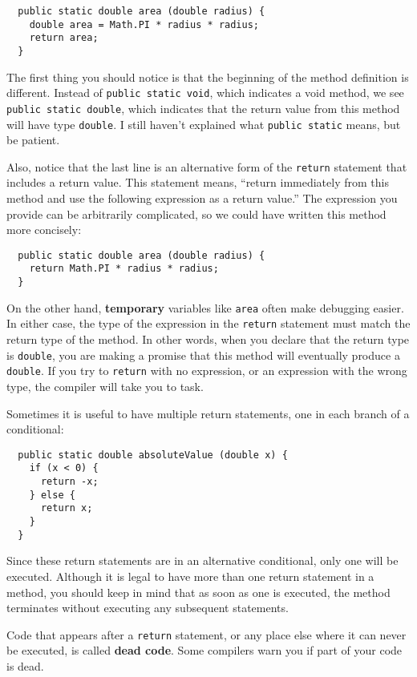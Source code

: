 \documentclass{book}
\begin{document}
\begin{verbatim}
  public static double area (double radius) {
    double area = Math.PI * radius * radius;
    return area;
  }
\end{verbatim}
%
The first thing you should notice is that the beginning of the
method definition is different.  Instead of {\tt public static
void}, which indicates a void method, we see {\tt public static
double}, which indicates that the return value from this method
will have type {\tt double}.  I still haven't explained what
{\tt public static} means, but be patient.


Also, notice that the last line is an alternative form of the
{\tt return} statement that includes a return value.  This
statement means, ``return immediately from this method and
use the following expression as a return value.''  The
expression you provide can be arbitrarily complicated,
so we could have written this method more concisely:

\begin{verbatim}
  public static double area (double radius) {
    return Math.PI * radius * radius;
  }
\end{verbatim}
%
On the other hand, {\bf temporary} variables like {\tt area} often
make debugging easier.  In either case, the type of the expression in
the {\tt return} statement must match the return type of the method.
In other words, when you declare that the return type is {\tt double},
you are making a promise that this method will eventually
produce a {\tt double}.  If you try to {\tt return} with no
expression, or an expression with the wrong type, the compiler will
take you to task.


Sometimes it is useful to have multiple return
statements, one in each branch of a conditional:

\begin{verbatim}
  public static double absoluteValue (double x) {
    if (x < 0) {
      return -x;
    } else {
      return x;
    }
  }
\end{verbatim}
%
Since these return statements are in an alternative conditional,
only one will be executed.  Although it is legal to have more than one
return statement in a method, you should keep in mind
that as soon as one is executed, the method
terminates without executing any subsequent statements.

Code that appears after a {\tt return} statement, or any place else
where it can never be executed, is called {\bf dead code}.  Some
compilers warn you if part of your code is dead.
\end{document}
